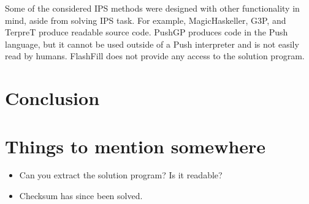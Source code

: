 Some of the considered IPS methods were designed with other functionality in mind, aside from solving IPS task. For example, MagicHaskeller, G3P, and TerpreT produce readable source code. PushGP produces code in the Push language, but it cannot be used outside of a Push interpreter and is not easily read by humans. FlashFill does not provide any access to the solution program.

\section{Conclusion}


\section{Things to mention somewhere}
\begin{itemize}
 \item Can you extract the solution program? Is it readable?
 \item Checksum has since been solved.
\end{itemize}
